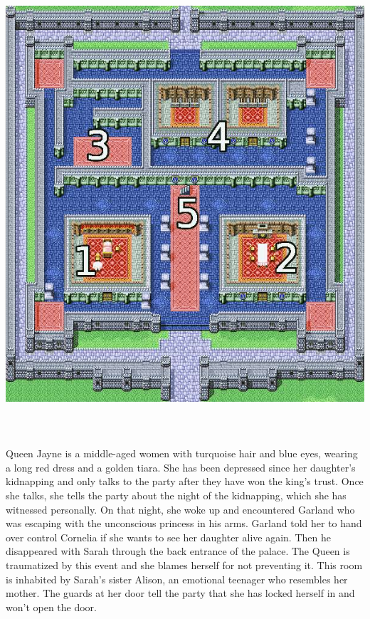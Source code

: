 %
\ofpar
%
\includegraphics[width=\columnwidth]{./art/chaosincornelia/castle.jpg}
%
\\\\
%
\\\\
%
 Queen Jayne is a middle-aged women with turquoise hair and blue eyes, wearing a long red dress and a golden tiara.
She has been depressed since her daughter's kidnapping and only talks to the party after they have won the king's trust.
Once she talks, she tells the party about the night of the kidnapping, which she has witnessed personally.
On that night, she woke up and encountered Garland who was escaping with the unconscious princess in his arms.
Garland told her to hand over control Cornelia if she wants to see her daughter alive again.
Then he disappeared with Sarah through the back entrance of the palace.
The Queen is traumatized by this event and she blames herself for not preventing it.
%
\ofpar
%
 This room is inhabited by Sarah's sister Alison, an emotional teenager who resembles her mother.
The guards at her door tell the party that she has locked herself in and won't open the door.
